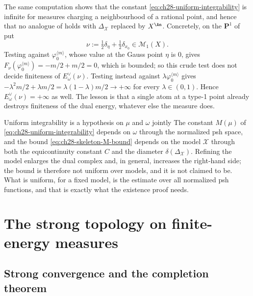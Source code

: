 \begin{example}
\label{ex:ch28-whole-space-not-admissible}
The same computation shows that the constant
\eqref{eq:ch28-uniform-integrability} is infinite for measures charging a
neighbourhood of a rational point, and hence that no analogue of
 holds with \(\Delta_{\mathcal X}\)
replaced by \(X^{\An}\).  Concretely, on the \(\mathbf P^1\) of
 put
\[
 \nu:=\tfrac12\delta_\eta+\tfrac12\delta_{x_0}\in\mathcal M_1(X).
\]
Testing against \(\varphi_0^{\langle m\rangle}\), whose value at the Gauss
point \(\eta\) is \(0\), gives
\(F_\nu(\varphi_0^{\langle m\rangle})=-m/2+m/2=0\), which is bounded; so this
crude test does not decide finiteness of \(E^\vee_\omega(\nu)\).  Testing
instead against \(\lambda\varphi_0^{\langle m\rangle}\) gives
\(-\lambda^2m/2+\lambda m/2=\lambda(1-\lambda)m/2\to+\infty\) for every
\(\lambda\in(0,1)\).  Hence \(E^\vee_\omega(\nu)=+\infty\) as well.  The
lesson is that a single atom at a type-1 point already destroys finiteness
of the dual energy, whatever else the measure does.
\end{example}

\begin{warning}{Uniform integrability is a hypothesis on \(\mu\) and
\(\omega\) jointly}
The constant \(M(\mu)\) of \eqref{eq:ch28-uniform-integrability} depends on
\(\omega\) through the normalized psh space, and the bound
\eqref{eq:ch28-skeleton-M-bound} depends on the model \(\mathcal X\) through
both the equicontinuity constant \(C\) and the diameter
\(\delta(\Delta_{\mathcal X})\).  Refining the model enlarges the dual
complex and, in general, increases the right-hand side; the bound is
therefore not uniform over models, and it is not claimed to be.  What is
uniform, for a fixed model, is the estimate over all normalized psh
functions, and that is exactly what the existence proof needs.
\end{warning}

\section{The strong topology on finite-energy measures}
\label{sec:ch28-strong-measures}

\subsection{Strong convergence and the completion theorem}
\label{sec:ch28-completion}

